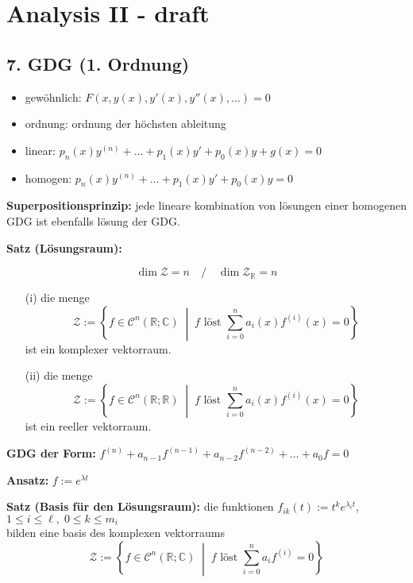 \section{Analysis II - draft}

\subsection{7. GDG (1. Ordnung)}

\begin{itemize}
  \item gewöhnlich: \quad \( F(x, y(x), y'(x), y''(x), \dots) = 0 \)
  \item ordnung: \quad ordnung der höchsten ableitung
  \item linear: \quad \( p_n(x)y^{(n)} + \dots + p_1(x)y' + p_0(x)y + g(x) = 0 \)
  \item homogen: \quad \( p_n(x)y^{(n)} + \dots + p_1(x)y' + p_0(x)y = 0 \)
\end{itemize}

\textbf{Superpositionsprinzip:} \quad
jede lineare kombination von lösungen einer homogenen GDG ist ebenfalls lösung der GDG.

\textbf{Satz (Lösungsraum):}

\[
\dim \mathcal{Z} = n \quad / \quad \dim \mathcal{Z}_{\mathbb{R}} = n
\]

\begin{itemize}
  \item[(i)] die menge 
    \[
    \mathcal{Z} := \left\{ f \in \mathcal{C}^n(\mathbb{R}; \mathbb{C}) \;\middle|\; f \text{ löst } \sum_{i=0}^{n} a_i(x) f^{(i)}(x) = 0 \right\}
    \]
    ist ein komplexer vektorraum.
    
  \item[(ii)] die menge 
    \[
    \mathcal{Z} := \left\{ f \in \mathcal{C}^n(\mathbb{R}; \mathbb{R}) \;\middle|\; f \text{ löst } \sum_{i=0}^{n} a_i(x) f^{(i)}(x) = 0 \right\}
    \]
    ist ein reeller vektorraum.
\end{itemize}

\textbf{GDG der Form:} \quad
$f^{(n)} + a_{n-1} f^{(n-1)} + a_{n-2} f^{(n-2)} + \dots + a_0 f = 0$

\textbf{Ansatz:} \quad $f := e^{\lambda t}$

\textbf{Satz (Basis für den Lösungsraum):} \quad
die funktionen \( f_{ik}(t) := t^k e^{\lambda_i t} \), \quad \( 1 \leq i \leq \ell, \; 0 \leq k \leq m_i \) \\
bilden eine basis des komplexen vektorraums
\[
\mathcal{Z} := \left\{ f \in \mathcal{C}^n(\mathbb{R}; \mathbb{C}) \;\middle|\; f \text{ löst } \sum_{i=0}^{n} a_i f^{(i)} = 0 \right\}
\]

